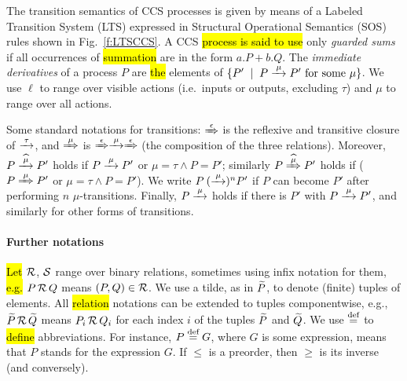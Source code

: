 The transition semantics of CCS processes is given by means of
a Labeled Transition System (LTS) expressed in Structural Operational
Semantics (SOS) rules shown in Fig.~\ref{f:LTSCCS}.
A CCS \hl{process is said to use} only \emph{guarded sums} if all occurrences of
\hl{summation} are in the form $a.P + b.Q$.
The \emph{immediate derivatives} of a
process $P$ are \hl{the} elements of $\{P' \st P \arr\mu P'
\mbox{ for some $\mu$}\}$.
We use $\ell$ to range over visible actions (i.e.~inputs or outputs, excluding $\tau$)
and $\mu$ to range over all actions.

Some standard notations for transitions: $\Arr\epsilon$ is the 
reflexive and transitive closure of $\arr\tau$, and 
$\Arr \mu $ is $\Arr\epsilon \arr\mu \Arr\epsilon$ (the
composition of the three relations).
Moreover,   
$P \arcap \mu P'$ holds if $P \arr\mu P'$ or $\mu =\tau \wedge P = P'$; similarly 
$P \Arcap \mu P'$ holds if ($P \Arr\mu P'$ or $\mu =\tau \wedge P = P'$).
We write $P \:(\arr\mu)^n P'$ if $P$ can become $P'$ after performing
$n$ $\mu$-transitions. Finally, $P \arr\mu$ holds if there is $P'$
with $P \arr\mu P'$, and similarly for other forms of transitions.

\paragraph{Further notations}
\hl{Let} $\R$, $\S$ range over binary relations, sometimes using 
 infix notation for them, \hl{e.g.} $P \,\R\, Q$ means $(P,Q) \in \R$.
We use a tilde, as in  $\til P$, to denote (finite) tuples of elements. 
All \hl{relation} notations can be extended to tuples componentwise,
e.g., $\til P \,\R\, \til Q$ means $P_i \,\R\, Q_i$ for each index $i$ of the tuples $\til P$ and $\til Q$.
We use $\DSdefi$ to \hl{define} abbreviations. For instance, $P \DSdefi G $, where
$G$ is some expression, means that $P$ stands for the expression $G$.
If $\leq$ is a preorder, then  $\geq$  is its inverse (and
conversely).

